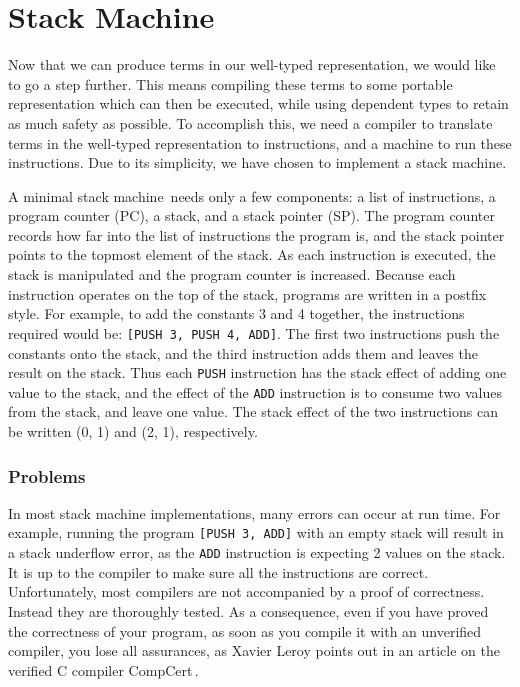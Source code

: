 \section{Stack Machine}
\label{sec:stack-machine}


Now that we can produce terms in our well-typed representation, we would like to go a step further. This means compiling these terms to some portable representation which can then be executed, while using dependent types to retain as much safety as possible. To accomplish this, we need a compiler to translate terms in the well-typed representation to instructions, and a machine to run these instructions. Due to its simplicity, we have chosen to implement a stack machine.

A minimal stack machine\,\cite[pp. 157--161]{Sestoft:PLC} needs only a few components: a list of instructions, a program counter (PC), a stack, and a stack pointer (SP). The program counter records how far into the list of instructions the program is, and the stack pointer points to the topmost element of the stack. As each instruction is executed, the stack is manipulated and the program counter is increased. Because each instruction operates on the top of the stack, programs are written in a postfix style. For example, to add the constants 3 and 4 together, the instructions required would be: \texttt{[PUSH 3, PUSH 4, ADD]}. The first two instructions push the constants onto the stack, and the third instruction adds them and leaves the result on the stack. Thus each \texttt{PUSH} instruction has the stack effect of adding one value to the stack, and the effect of the \texttt{ADD} instruction is to consume two values from the stack, and leave one value. The stack effect of the two instructions can be written (0, 1) and (2, 1), respectively.

\subsubsection{Problems}
In most stack machine implementations, many errors can occur at run time. For example, running the program \texttt{[PUSH 3, ADD]} with an empty stack will result in a stack underflow error, as the \texttt{ADD} instruction is expecting 2 values on the stack. It is up to the compiler to make sure all the instructions are correct. Unfortunately, most compilers are not accompanied by a proof of correctness. Instead they are thoroughly tested. As a consequence, even if you have proved the correctness of your program, as soon as you compile it with an unverified compiler, you lose all assurances, as Xavier Leroy points out in an article on the verified C compiler CompCert\,\cite{Leroy_formalverification}.

